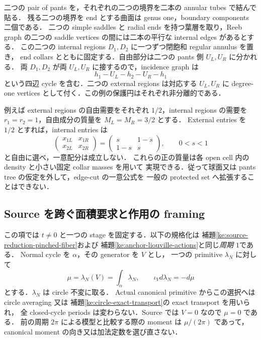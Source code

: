 \begin{example}
\label{ng8:positive-genus-incidence-cycle}
二つの pair of pants を，それぞれの二つの境界を二本の annular tubes で結んで貼る．
残る二つの境界を end とする曲面は genus one，boundary components 二個である．
二つの simple saddles と radial ends を持つ葉層を取り，Reeb graph の二つの
saddle vertices の間には二本の平行な internal edges があるとする．
この二つの internal regions $D_1,D_2$ に一つずつ閉飽和 regular annulus を置き，
end collars とともに固定する．自由部分は二つの pants 側 $U_L,U_R$ に分かれる．
両 $D_1,D_2$ が両 $U_L,U_R$ に接するので，incidence graph は
\[
 h_1-U_L-h_2-U_R-h_1
\]
という四辺 cycle を含む．二つの external regions は対応する $U_L,U_R$ に
degree-one vertices として付く．この例の保護円はそれぞれ非分離的である．

例えば external regions の自由需要をそれぞれ $1/2$，internal regions の需要を
$r_1=r_2=1$，自由成分の質量を $M_L=M_R=3/2$ とする．
External entries を $1/2$ とすれば，internal entries は
\[
 \begin{pmatrix}x_{1L}&x_{1R}\\x_{2L}&x_{2R}\end{pmatrix}
 =\begin{pmatrix}s&1-s\\1-s&s\end{pmatrix},\qquad 0<s<1
\]
と自由に選べ，一意配分は成立しない．
これらの正の質量は各 open cell 内の density と小さい固定 collar masses を用いて
実現できる．従って球面又は pants tree の仮定を外して，edge-cut の一意公式を
一般の protected set へ拡張することはできない．
\end{example}

\subsection{Source を跨ぐ面積要求と作用の framing}

この項では $t\ne0$ と一つの stage を固定する．以下の規格化は
補題\ref{ke:source-reduction-pinched-fiber}および
補題\ref{ke:anchor-liouville-actions}と同じ\emph{周期 $1$}である．
Normal cycle を $\alpha$，その generator を $V$ とし，
一つの primitive $\lambda_N$ に対して
\[
 \mu=\lambda_N(V)=\int_\alpha\lambda_N,\qquad
 \iota_Vd\lambda_N=-d\mu
\]
とする．$\lambda_N$ は circle 不変に取る．
Actual canonical primitive からこの選択へは circle averaging 又は
補題\ref{ke:circle-exact-transport}の exact transport を用いられ，
全 closed-cycle periods は変わらない．Source では $V=0$ なので $\mu=0$ である．
前の周期 $2\pi$ による模型と比較する際の moment は $\mu/(2\pi)$ であって，
canonical moment の向き又は加法定数を選び直さない．

